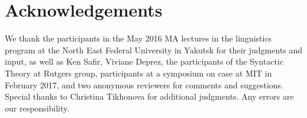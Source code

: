 \documentclass[output=paper]{langsci/langscibook}
\begin{document}
\printchapterglossary{}

\section*{Acknowledgements}

We thank the participants in the May 2016 MA lectures in the linguistics
program at the North East Federal University in Yakutsk for their judgments and
input, as well as Ken Safir, Viviane Deprez, the participants of the Syntactic
Theory at Rutgers group, participants at a symposium on case at MIT in February
2017, and two anonymous reviewers for comments and suggestions. Special thanks
to Christina Tikhonova for additional  judgments. Any errors are our
responsibility.

{\sloppy\printbibliography[heading=subbibliography,notkeyword=this]}
\end{document}
